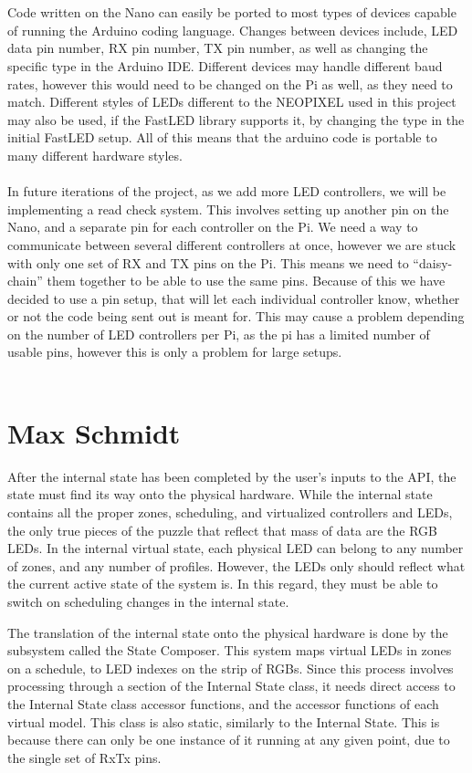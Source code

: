 \documentclass[onecolumn, draftclsnofoot,10pt, compsoc]{IEEEtran}
\begin{document}
	\\\\
	\noindent Code written on the Nano can easily be ported to most types of devices capable
	of running the Arduino coding language. Changes between devices include, LED
	data pin number, RX pin number, TX pin number, as well as changing the
	specific type in the Arduino IDE. Different devices may handle different baud
	rates, however this would need to be changed on the Pi as well, as they need to
	match. Different styles of LEDs different to the NEOPIXEL used in this project
	may also be used, if the FastLED library supports it, by changing the type in
	the initial FastLED setup. All of this means that the arduino code is portable
	to many different hardware styles.
	\\\\
	\noindent In future iterations of the project, as we add more LED controllers, we will
	be implementing a read check system. This involves setting up another pin on
	the Nano, and a separate pin for each controller on the Pi. We need a way to
	communicate between several different controllers at once, however we are
	stuck with only one set of RX and TX pins on the Pi. This means we need to
	“daisy-chain” them together to be able to use the same pins. Because of this
	we have decided to use a pin setup, that will let each individual controller
	know, whether or not the code being sent out is meant for. This may cause a
	problem depending on the number of LED controllers per Pi, as the pi has a
	limited number of usable pins, however this is only a problem for large setups.
	\\\\
	\section{Max Schmidt}
	After the internal state has been completed by the user's inputs to the API, the state must find its way onto the physical hardware. 
	While the internal state contains all the proper zones, scheduling, and virtualized controllers and LEDs, the only true pieces of 
	the puzzle that reflect that mass of data are the RGB LEDs. In the internal virtual state, each physical LED can belong to any number 
	of zones, and any number of profiles. However, the LEDs only should reflect what the current active state of the system is. In this 
	regard, they must be able to switch on scheduling changes in the internal state.  

	\noindent The translation of the internal state onto the physical hardware is done by the subsystem called the State Composer. This 
	system maps virtual LEDs in zones on a schedule, to LED indexes on the strip of RGBs. Since this process involves processing through
	a section of the Internal State class, it needs direct access to the Internal State class accessor functions, and the accessor functions 
	of each virtual model. This class is also static, similarly to the Internal State.  This is because there can only be one instance of it 
	running at any given point, due to the single set of RxTx pins.  
\end{document}
